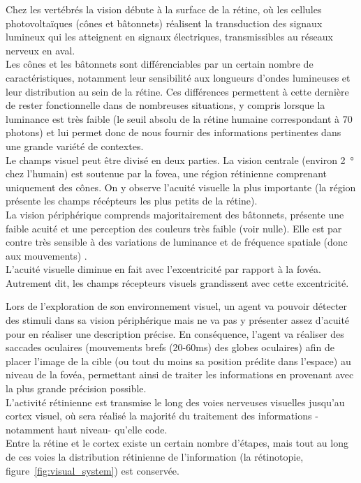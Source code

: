 Chez les vertébrés la vision débute à la surface de la rétine, où les cellules photovoltaïques (cônes et bâtonnets) réalisent la transduction des signaux lumineux qui les atteignent en signaux électriques, transmissibles au réseaux nerveux en aval.\\
Les cônes et les bâtonnets sont différenciables par un certain nombre de caractéristiques, notamment leur sensibilité aux longueurs d'ondes lumineuses et leur distribution au sein de la rétine. Ces différences permettent à cette dernière de rester fonctionnelle dans de nombreuses situations, y compris lorsque la luminance est très faible (le seuil absolu de la rétine humaine correspondant à 70 photons) et lui permet donc de nous fournir des informations pertinentes dans une grande variété de contextes.\\
Le champs visuel peut être divisé en deux parties. La vision centrale (environ \SI{2}{\degree} chez l'humain) est soutenue par la fovea, une région rétinienne comprenant uniquement des cônes. On y observe l'acuité visuelle la plus importante (la région présente les champs récépteurs les plus petits de la rétine).\\
La vision périphérique comprends majoritairement des bâtonnets, présente une faible acuité et une perception des couleurs très faible (voir nulle). Elle est par contre très sensible à des variations de luminance et de fréquence spatiale (donc aux mouvements) \autocite{Werner2014}.\\
 L'acuité visuelle diminue en fait avec l'excentricité par rapport à la fovéa. Autrement dit, les champs récepteurs visuels grandissent avec cette excentricité.

Lors de l'exploration de son environnement visuel, un agent va pouvoir détecter des stimuli dans sa vision périphérique mais ne va pas y présenter assez d'acuité pour en réaliser une description précise.
En conséquence, l'agent va réaliser des saccades oculaires (mouvements brefs (20-60\si{\milli\second}) des globes oculaires) afin de placer l'image de la cible (ou tout du moins sa position prédite dans l'espace) au niveau de la fovéa, permettant ainsi de traiter les informations en provenant avec la plus grande précision possible.\\

L'activité rétinienne est transmise le long des voies nerveuses visuelles jusqu'au cortex visuel, où sera réalisé la majorité du traitement des informations -notamment haut niveau- qu'elle code. \\
Entre la rétine et le cortex existe un certain nombre d'étapes, mais tout au long de ces voies la distribution rétinienne de l'information (la rétinotopie, figure~\ref{fig:visual_system}) est conservée. 


